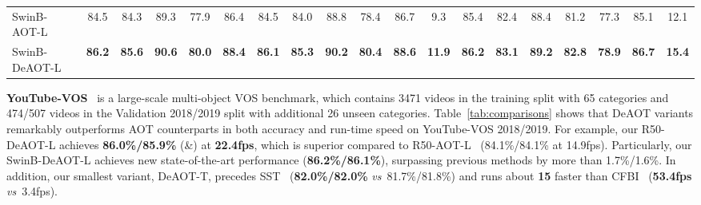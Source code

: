 \documentclass{article}
\def\vs{\emph{vs}~}
\begin{document}
\begin{table}[t!]
\begin{tabular}{l|ccccc|ccccc|c|ccc|ccc|c}
\hline
SwinB-AOT-L~\cite{aot}  & {84.5}  &  {84.3}  & {89.3}  & {77.9}  & {86.4}  & {84.5}  &  {84.0}  & {88.8}  & {78.4}  & {86.7} & 9.3  & {85.4} & {82.4} & {88.4}   & {81.2} & {77.3} & {85.1} & 12.1  \\
SwinB-DeAOT-L & \textbf{86.2}  &  \textbf{85.6}  & \textbf{90.6}  & \textbf{80.0}  & \textbf{88.4}  & \textbf{86.1}  &  \textbf{85.3}  & \textbf{90.2}  & \textbf{80.4}  & \textbf{88.6} & \textbf{11.9}  & \textbf{86.2} & \textbf{83.1} & \textbf{89.2}   & \textbf{82.8} & \textbf{78.9} & \textbf{86.7} & \textbf{15.4} \\
\bottomrule[1.5pt]
\end{tabular}



\end{table}





 
\noindent \textbf{YouTube-VOS}~\cite{youtubevos} is a large-scale multi-object VOS benchmark, which contains 3471 videos in the training split with 65 categories and 474/507 videos in the Validation 2018/2019 split with additional 26 unseen categories. Table~\ref{tab:comparisons} shows that DeAOT variants remarkably outperforms AOT counterparts in both accuracy and run-time speed on YouTube-VOS 2018/2019. For example, our R50-DeAOT-L achieves \textbf{86.0\%/85.9\%} (\&) at \textbf{22.4fps}, which is superior compared to R50-AOT-L~\cite{aot} (84.1\%/84.1\% at 14.9fps). Particularly, our SwinB-DeAOT-L achieves new state-of-the-art performance (\textbf{86.2\%/86.1\%}), surpassing previous methods by more than 1.7\%/1.6\%. In addition, our smallest variant, DeAOT-T, precedes SST~\cite{sstvos} (\textbf{82.0\%/82.0\%} \vs 81.7\%/81.8\%) and runs about \textbf{15} faster than CFBI~\cite{cfbi} (\textbf{53.4fps} \vs 3.4fps).
\end{document}
